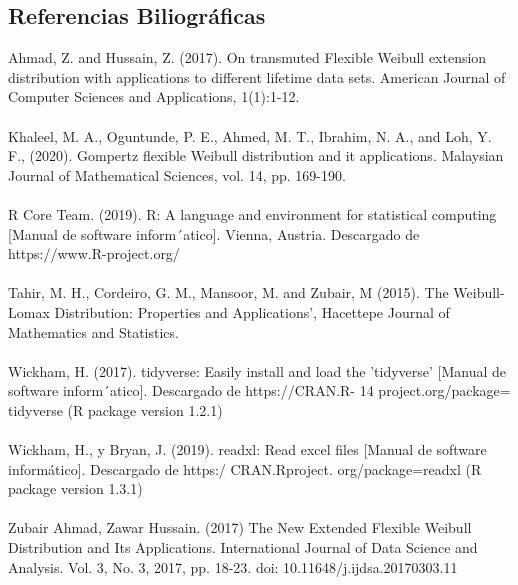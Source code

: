 \documentclass[12pt,a4paper]{article}
\begin{document}
\subsection*{Referencias Biliográficas}
Ahmad, Z. and Hussain, Z. (2017). On transmuted Flexible Weibull extension distribution with applications to different lifetime data sets. American Journal of Computer Sciences and Applications, 1(1):1-12.\\
\\
Khaleel, M. A., Oguntunde, P. E., Ahmed, M. T., Ibrahim, N. A., and Loh, Y. F., (2020). Gompertz flexible Weibull distribution and it applications. Malaysian Journal of Mathematical Sciences, vol. 14, pp. 169-190.\\
\\
R Core Team. (2019). R: A language and environment for statistical computing [Manual de software inform´atico]. Vienna, Austria. Descargado de https://www.R-project.org/\\
\\
Tahir, M. H., Cordeiro, G. M., Mansoor, M. and Zubair, M (2015). The Weibull-Lomax Distribution: Properties and Applications', Hacettepe Journal of Mathematics and Statistics. \\
\\
Wickham, H. (2017). tidyverse: Easily install and load the ’tidyverse’ [Manual de software inform´atico]. Descargado de https://CRAN.R- 14 project.org/package= tidyverse (R package version 1.2.1) \\
\\
Wickham, H., y Bryan, J. (2019). readxl: Read excel files [Manual de software informático]. Descargado de https:/ CRAN.Rproject. org/package=readxl (R package version 1.3.1)\\
\\
Zubair Ahmad, Zawar Hussain. (2017) The New Extended Flexible Weibull Distribution and Its Applications. International Journal of Data Science and Analysis. Vol. 3, No. 3, 2017, pp. 18-23. doi: 10.11648/j.ijdsa.20170303.11
\end{document}
